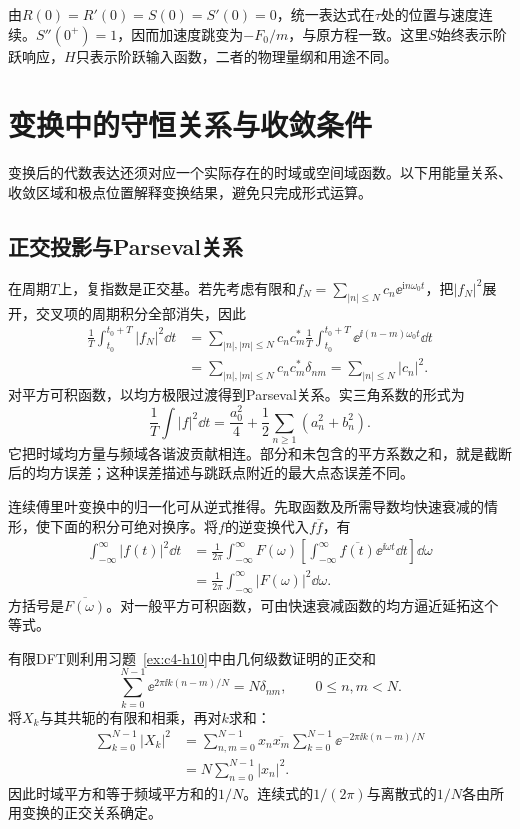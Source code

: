 由$R(0)=R'(0)=S(0)=S'(0)=0$，统一表达式在$\tau$处的位置与速度连续。$S''(0^+)=1$，因而加速度跳变为$-F_0/m$，与原方程一致。这里$S$始终表示阶跃响应，$H$只表示阶跃输入函数，二者的物理量纲和用途不同。



\section{变换中的守恒关系与收敛条件}
变换后的代数表达还须对应一个实际存在的时域或空间域函数。以下用能量关系、收敛区域和极点位置解释变换结果，避免只完成形式运算。

\subsection{正交投影与Parseval关系}
在周期$T$上，复指数是正交基。若先考虑有限和$f_N=\sum_{|n|\le N}c_n\ee^{\mathrm in\omega_0t}$，把$|f_N|^2$展开，交叉项的周期积分全部消失，因此
\[\begin{aligned}
\frac1T\int_{t_0}^{t_0+T}|f_N|^2\dd t
&=\sum_{|n|,|m|\le N}c_nc_m^*
\frac1T\int_{t_0}^{t_0+T}\ee^{\ii(n-m)\omega_0t}\dd t\\
&=\sum_{|n|,|m|\le N}c_nc_m^*\delta_{nm}
=\sum_{|n|\le N}|c_n|^2.
\end{aligned}\]
对平方可积函数，以均方极限过渡得到Parseval关系。实三角系数的形式为
\[\frac1T\int|f|^2\dd t=\frac{a_0^2}{4}+\frac12\sum_{n\ge1}(a_n^2+b_n^2).
\]
它把时域均方量与频域各谐波贡献相连。部分和未包含的平方系数之和，就是截断后的均方误差；这种误差描述与跳跃点附近的最大点态误差不同。

连续傅里叶变换中的归一化可从逆式推得。先取函数及所需导数均快速衰减的情形，使下面的积分可绝对换序。将$f$的逆变换代入$f\overline f$，有
\[
\begin{aligned}
 \int_{-\infty}^{\infty}|f(t)|^2\dd t
 &=\frac1{2\pi}\int_{-\infty}^{\infty}F(\omega)
 \left[\int_{-\infty}^{\infty}\overline{f(t)}\ee^{\ii\omega t}\dd t\right]\dd\omega\\
 &=\frac1{2\pi}\int_{-\infty}^{\infty}|F(\omega)|^2\dd\omega.
\end{aligned}
\]
方括号是$\overline{F(\omega)}$。对一般平方可积函数，可由快速衰减函数的均方逼近延拓这个等式。

有限DFT则利用习题~\ref{ex:c4-h10}中由几何级数证明的正交和
\[
 \sum_{k=0}^{N-1}\ee^{2\pi\ii k(n-m)/N}=N\delta_{nm},
 \qquad 0\le n,m<N.
\]
将$X_k$与其共轭的有限和相乘，再对$k$求和：
\[
\begin{aligned}
 \sum_{k=0}^{N-1}|X_k|^2
 &=\sum_{n,m=0}^{N-1}x_n\overline{x_m}
 \sum_{k=0}^{N-1}\ee^{-2\pi\ii k(n-m)/N}\\
 &=N\sum_{n=0}^{N-1}|x_n|^2.
\end{aligned}
\]
因此时域平方和等于频域平方和的$1/N$。连续式的$1/(2\pi)$与离散式的$1/N$各由所用变换的正交关系确定。

